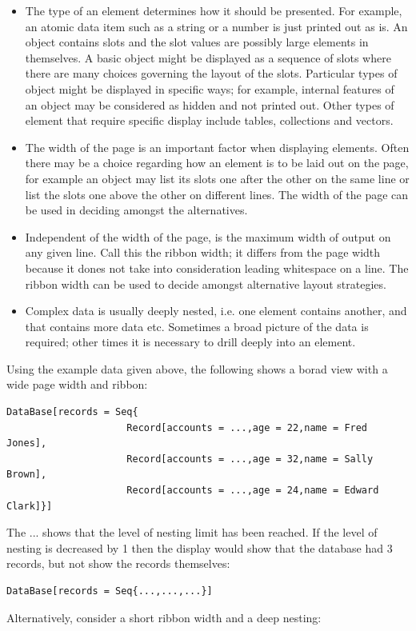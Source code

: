 \begin{itemize}
\item The type of an element determines how it should be presented. For
example, an atomic data item such as a string or a number is just
printed out as is. An object contains slots and the slot values are
possibly large elements in themselves. A basic object might be displayed
as a sequence of slots where there are many choices governing the
layout of the slots. Particular types of object might be displayed
in specific ways; for example, internal features of an object may
be considered as hidden and not printed out. Other types of element
that require specific display include tables, collections and vectors.
\item The width of the page is an important factor when displaying elements.
Often there may be a choice regarding how an element is to be laid
out on the page, for example an object may list its slots one after
the other on the same line or list the slots one above the other on
different lines. The width of the page can be used in deciding amongst
the alternatives.
\item Independent of the width of the page, is the maximum width of output
on any given line. Call this the ribbon width; it differs from the
page width because it dones not take into consideration leading whitespace
on a line. The ribbon width can be used to decide amongst alternative
layout strategies.
\item Complex data is usually deeply nested, i.e. one element contains another,
and that contains more data etc. Sometimes a broad picture of the
data is required; other times it is necessary to drill deeply into
an element. 
\end{itemize}
Using the example data given above, the following shows a borad view
with a wide page width and ribbon:

\begin{lstlisting}
DataBase[records = Seq{
                     Record[accounts = ...,age = 22,name = Fred Jones],
                     Record[accounts = ...,age = 32,name = Sally Brown],
                     Record[accounts = ...,age = 24,name = Edward Clark]}]
\end{lstlisting}The ... shows that the level of nesting limit has been reached. If
the level of nesting is decreased by 1 then the display would show
that the database had 3 records, but not show the records themselves:

\begin{lstlisting}
DataBase[records = Seq{...,...,...}]
\end{lstlisting}Alternatively, consider a short ribbon width and a deep nesting:

